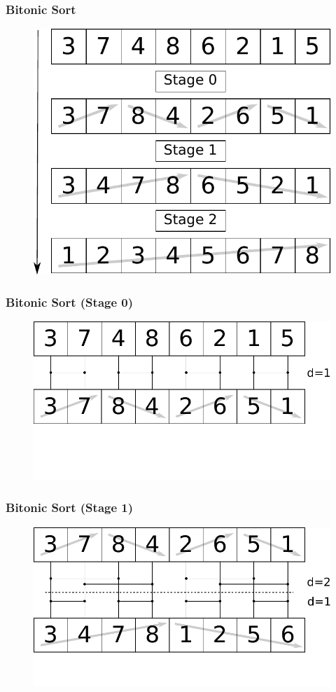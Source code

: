 \documentclass[aspectratio=169,handout]{beamer}
\begin{document}
\frame
{	
	\frametitle{Bitonic Sort}
	\begin{figure}
		\centering
		\includegraphics[height=0.8\textheight]{bitonic}
	\end{figure}
}


\frame
{
	\frametitle{Bitonic Sort (Stage 0)}
	\begin{figure}
		\centering
		\includegraphics[height=0.6\textheight]{bitonic0}
	\end{figure}
}

\frame
{
	\frametitle{Bitonic Sort (Stage 1)}
	\begin{figure}
		\centering
		\includegraphics[height=0.6\textheight]{bitonic1}
	\end{figure}
}
\end{document}
